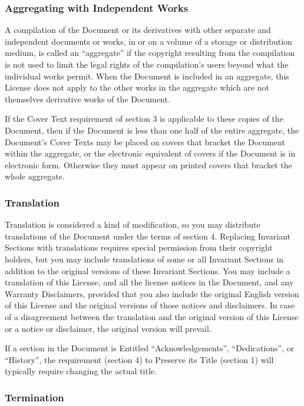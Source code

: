 \subsubsection{Aggregating with Independent Works}

A compilation of the Document or its derivatives with other separate and independent documents or works, in or on a volume of a storage or distribution medium, is called an ``aggregate'' if the copyright resulting from the compilation is not used to limit the legal rights of the compilation's users beyond what the individual works permit. When the Document is included in an aggregate, this License does not apply to the other works in the aggregate which are not themselves derivative works of the Document.

If the Cover Text requirement of section 3 is applicable to these copies of the Document, then if the Document is less than one half of the entire aggregate, the Document's Cover Texts may be placed on covers that bracket the Document within the aggregate, or the electronic equivalent of covers if the Document is in electronic form. Otherwise they must appear on printed covers that bracket the whole aggregate.

\subsubsection{Translation}

Translation is considered a kind of modification, so you may distribute translations of the Document under the terms of section 4. Replacing Invariant Sections with translations requires special permission from their copyright holders, but you may include translations of some or all Invariant Sections in addition to the original versions of these Invariant Sections. You may include a translation of this License, and all the license notices in the Document, and any Warranty Disclaimers, provided that you also include the original English version of this License and the original versions of those notices and disclaimers. In case of a disagreement between the translation and the original version of this License or a notice or disclaimer, the original version will prevail.

If a section in the Document is Entitled ``Acknowledgements'', ``Dedications'', or ``History'', the requirement (section 4) to Preserve its Title (section 1) will typically require changing the actual title.

\subsubsection{Termination}

